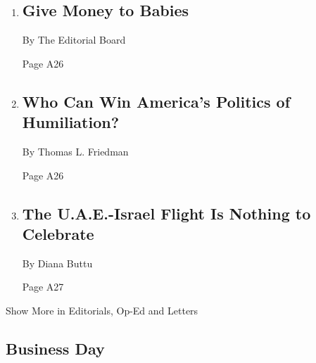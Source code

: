 \begin{enumerate}
\def\labelenumi{\arabic{enumi}.}
\item
  \href{/2020/09/08/opinion/baby-bonds-new-jersey.html}{}

  \hypertarget{give-money-to-babies}{%
  \subsection{Give Money to Babies}\label{give-money-to-babies}}

  By The Editorial Board

  Page A26
\item
  \href{/2020/09/08/opinion/biden-trump-humiliation.html}{}

  \hypertarget{who-can-win-americas-politics-of-humiliation}{%
  \subsection{Who Can Win America's Politics of
  Humiliation?}\label{who-can-win-americas-politics-of-humiliation}}

  By Thomas L. Friedman

  Page A26
\item
  \href{/2020/09/08/opinion/uae-israel-palestinians.html}{}

  \hypertarget{the-uae-israel-flight-is-nothing-to-celebrate}{%
  \subsection{The U.A.E.-Israel Flight Is Nothing to
  Celebrate}\label{the-uae-israel-flight-is-nothing-to-celebrate}}

  By Diana Buttu

  Page A27
\end{enumerate}

Show More in Editorials, Op-Ed and Letters

\hypertarget{business-day}{%
\subsection{Business Day}\label{business-day}}

